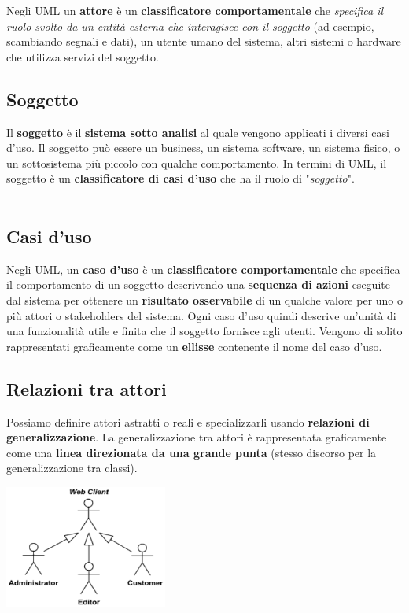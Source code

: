 \documentclass{article}
\begin{document}
Negli UML un \textbf{attore} è un \textbf{classificatore comportamentale} che \textit{specifica il ruolo svolto da un entità esterna che interagisce con il soggetto} (ad esempio, scambiando segnali e dati), un utente umano del sistema, altri sistemi o hardware che utilizza servizi del soggetto.

\subsection*{Soggetto}
\large

Il \textbf{soggetto} è il \textbf{sistema sotto analisi} al quale vengono applicati i diversi casi d'uso. Il soggetto può essere un business, un sistema software, un sistema fisico, o un sottosistema più piccolo con qualche comportamento. In termini di UML, il soggetto è un \textbf{classificatore di casi d'uso} che ha il ruolo di "\textit{soggetto}". \\ \\

\subsection*{Casi d'uso}
\large

Negli UML, un \textbf{caso d'uso} è un \textbf{classificatore comportamentale} che specifica il comportamento di un soggetto descrivendo una \textbf{sequenza di azioni} eseguite dal sistema per ottenere un \textbf{risultato osservabile} di un qualche valore per uno o più attori o stakeholders del sistema. Ogni caso d'uso quindi descrive un'unità di una funzionalità utile e finita che il soggetto fornisce agli utenti. Vengono di solito rappresentati graficamente come un \textbf{ellisse} contenente il nome del caso d'uso.

\subsection*{Relazioni tra attori}
\large

Possiamo definire attori astratti o reali e specializzarli usando \textbf{relazioni di generalizzazione}. La generalizzazione tra attori è rappresentata graficamente come una \textbf{linea direzionata da una grande punta} (stesso discorso per la generalizzazione tra classi).
\begin{center}
    \includegraphics[width=0.4\textwidth]{foto 2.png}
\end{center}
\end{document}
